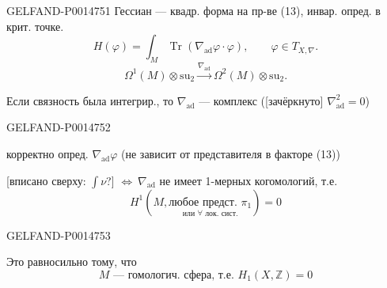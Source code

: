 \begin{GelfandAdjacentEvidence}{GELFAND-P001475}{1}
Гессиан — квадр. форма на пр-ве (13), инвар. опред. в крит. точке.
\begin{equation*}
H(\varphi)=\int_M\operatorname{Tr}(\nabla_{\mathrm{ad}}\varphi\cdot\varphi),\qquad
\varphi\in T_{X,\nabla}.
\tag{14}
\end{equation*}
\begin{equation*}
\Omega^1(M)\otimes\mathrm{su}_2
\xrightarrow{\nabla_{\mathrm{ad}}}\Omega^2(M)\otimes\mathrm{su}_2.
\tag{15}
\end{equation*}

Если связность была интегрир., то \(\nabla_{\mathrm{ad}}\) — комплекс
([зачёркнуто] \(\nabla_{\mathrm{ad}}^2=0\))

\end{GelfandAdjacentEvidence}
\begin{GelfandAdjacentEvidence}{GELFAND-P001475}{2}


корректно опред. \(\nabla_{\mathrm{ad}}\varphi\) (не зависит от представителя в факторе (13))

 [вписано сверху: \(\int\nu\)?]
\(\Longleftrightarrow\ \nabla_{\mathrm{ad}}\) не имеет 1-мерных когомологий, т.е.
\begin{equation*}
H^1\!\left(M,\underset{\text{или \(\forall\) лок. сист.}}{\text{любое предст. }\pi_1}\right)=0
\tag{16}
\end{equation*}
\end{GelfandAdjacentEvidence}
\begin{GelfandAdjacentEvidence}{GELFAND-P001475}{3}


Это равносильно тому, что
\begin{equation*}
M\text{ — гомологич. сфера, т.е. }H_1(X,\mathbb Z)=0
\tag{17}
\end{equation*}
\end{GelfandAdjacentEvidence}
